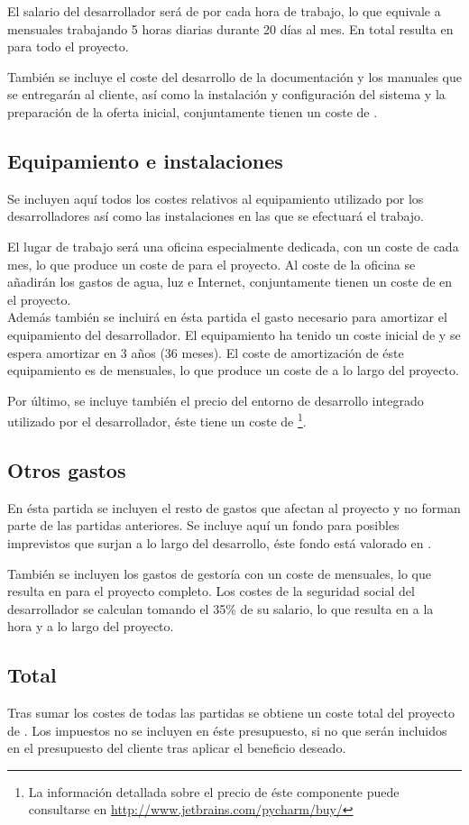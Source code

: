 	El salario del desarrollador será de   por cada hora de trabajo, lo que equivale a   mensuales trabajando 5 horas diarias durante 20 días al mes.  En total resulta en  para todo el proyecto.
	
	También se incluye el coste del desarrollo de la documentación y los manuales que se entregarán al cliente, así como la instalación y configuración del sistema y la preparación de la oferta inicial, conjuntamente tienen un coste de .

\subsection{Equipamiento e instalaciones}
	Se incluyen aquí todos los costes relativos al equipamiento utilizado por los desarrolladores así como las instalaciones en las que se efectuará el trabajo.
	
	El lugar de trabajo será una oficina especialmente dedicada, con un coste de  cada mes, lo que produce un coste de  para el proyecto.  Al coste de la oficina se añadirán los gastos de agua, luz e Internet, conjuntamente tienen un coste de  en el proyecto.\\
	Además también se incluirá en ésta partida el gasto necesario para amortizar el equipamiento del desarrollador.  El equipamiento ha tenido un coste inicial de  y se espera amortizar en 3 años (36 meses).  El coste de amortización de éste equipamiento es de  mensuales, lo que produce un coste de  a lo largo del proyecto.
	
	Por último, se incluye también el precio del entorno de desarrollo integrado utilizado por el desarrollador, éste tiene un coste de \footnote{La información detallada sobre el precio de éste componente puede consultarse en \url{http://www.jetbrains.com/pycharm/buy/}}.
	
\subsection{Otros gastos}
	En ésta partida se incluyen el resto de gastos que afectan al proyecto y no forman parte de las partidas anteriores.  Se incluye aquí un fondo para posibles imprevistos que surjan a lo largo del desarrollo, éste fondo está valorado en .
	
	También se incluyen los gastos de gestoría con un coste de  mensuales, lo que resulta en  para el proyecto completo.  Los costes de la seguridad social del desarrollador se calculan tomando el 35\% de su salario, lo que resulta en  a la hora y  a lo largo del proyecto.
	
\subsection{Total}
	Tras sumar los costes de todas las partidas se obtiene un coste total del proyecto de .  Los impuestos no se incluyen en éste presupuesto, si no que serán incluidos en el presupuesto del cliente tras aplicar el beneficio deseado.